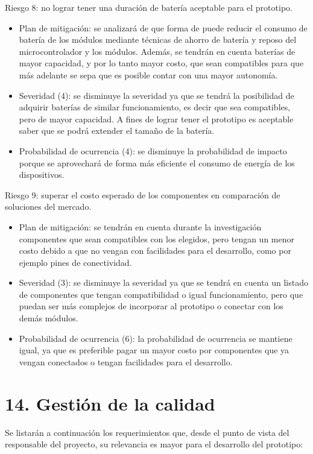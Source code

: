 \documentclass[
11pt, %
]{charter}
\begin{document}
Riesgo 8: no lograr tener una duración de batería aceptable para el prototipo.
\begin{itemize}
	\item Plan de mitigación: se analizará de que forma de puede reducir el consumo de batería de los módulos mediante técnicas de ahorro de batería y reposo del microcontrolador y los módulos. Además, se tendrán en cuenta baterías de mayor capacidad, y por lo tanto mayor costo, que sean compatibles para que más adelante se sepa que es posible contar con una mayor autonomía.
	\item Severidad (4): se disminuye la severidad ya que se tendrá la posibilidad de adquirir baterías de similar funcionamiento, es decir que sea compatibles, pero de mayor capacidad. A fines de lograr tener el prototipo es aceptable saber que se podrá extender el tamaño de la batería.
	\item Probabilidad de ocurrencia (4): se disminuye la probabilidad de impacto porque se aprovechará de forma más eficiente el consumo de energía de los dispositivos.
\end{itemize}

Riesgo 9: superar el costo esperado de los componentes en comparación de soluciones del mercado.
\begin{itemize}
	\item Plan de mitigación: se tendrán en cuenta durante la investigación componentes que sean compatibles con los elegidos, pero tengan un menor costo debido a que no vengan con facilidades para el desarrollo, como por ejemplo pines de conectividad.
	\item Severidad (3): se disminuye la severidad ya que se tendrá en cuenta un listado de componentes que tengan compatibilidad o igual funcionamiento, pero que puedan ser más complejos de incorporar al prototipo o conectar con los demás módulos.
	\item Probabilidad de ocurrencia (6): la probabilidad de ocurrencia se mantiene igual, ya que es preferible pagar un mayor costo por componentes que ya vengan conectados o tengan facilidades para el desarrollo.
\end{itemize}

\section{14. Gestión de la calidad}
\label{sec:calidad}

Se listarán a continuación los requerimientos que, desde el punto de vista del responsable del proyecto, su relevancia es mayor para el desarrollo del prototipo:
\end{document}
